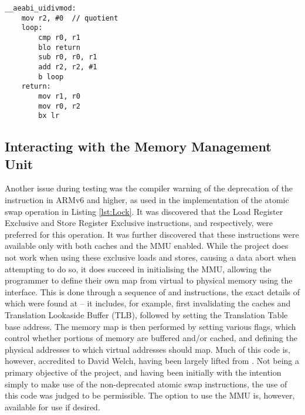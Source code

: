     \lstset{language=c}
    \begin{lstlisting}[caption={Implementation of unsigned integer division and
    modulo in ARM assembly},captionpos=b,label={lst:uidiv}]
__aeabi_uidivmod:
    mov r2, #0  // quotient
    loop:
        cmp r0, r1
        blo return
        sub r0, r0, r1
        add r2, r2, #1
        b loop
    return:
        mov r1, r0
        mov r0, r2
        bx lr
    \end{lstlisting}

\subsection{Interacting with the Memory Management Unit}
    Another issue during testing was the compiler warning of the deprecation of
    the  instruction in ARMv6 and higher, as used in the
    implementation of the atomic swap operation in Listing \ref{lst:Lock}. It
    was discovered that the Load Register Exclusive and Store Register Exclusive
    instructions,  and  respectively, were preferred for
    this operation. It was further discovered \cite{CacheEnable} that these
    instructions were available only with both caches and the MMU enabled. While
    the project does not work when using these exclusive loads and stores,
    causing a data abort when attempting to do so, it does succeed in
    initialising the MMU, allowing the programmer to define their own map from
    virtual to physical memory using the  interface. This
    is done through a sequence of  and  instructions, the
    exact details of which were found at \cite[pg.~3-14]{TRM} -- it includes,
    for example, first invalidating the caches and Translation Lookaside Buffer
    (TLB), followed by setting the Translation Table base address. The memory
    map is then performed by setting various flags, which control whether
    portions of memory are buffered and/or cached, and defining the physical
    addresses to which virtual addresses should map. Much of this code is,
    however, accredited to David Welch, having been largely lifted from
    \cite{dwelch67}. Not being a primary objective of the project, and having
    been initially with the intention simply to make use of the non-deprecated
    atomic swap instructions, the use of this code was judged to be permissible.
    The option to use the MMU is, however, available for use if desired.

